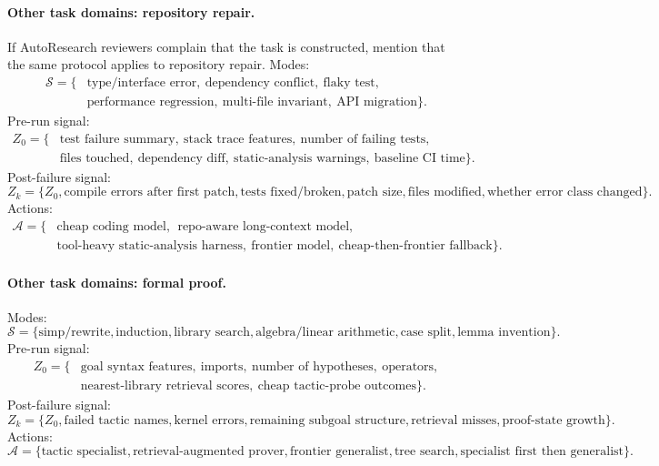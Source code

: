 \documentclass{article}
\begin{document}
\paragraph{Other task domains: repository repair.}
If AutoResearch reviewers complain that the task is constructed, mention that the same protocol
applies to repository repair.
Modes:
\[
\begin{aligned}
    \mathcal S=\{&\text{type/interface error},\ \text{dependency conflict},
    \ \text{flaky test},\\
    &\text{performance regression},\ \text{multi-file invariant},
    \ \text{API migration}\}.
\end{aligned}
\]
Pre-run signal:
\[
\begin{aligned}
    Z_0=\{&\text{test failure summary},\ \text{stack trace features},
    \ \text{number of failing tests},\\
    &\text{files touched},\ \text{dependency diff},
    \ \text{static-analysis warnings},\ \text{baseline CI time}\}.
\end{aligned}
\]
Post-failure signal:
\[
    Z_k
    =
    \{
    Z_0,
    \text{compile errors after first patch},
    \text{tests fixed/broken},
    \text{patch size},
    \text{files modified},
    \text{whether error class changed}
    \}.
\]
Actions:
\[
\begin{aligned}
    \mathcal A=\{&\text{cheap coding model},\
    \ \text{repo-aware long-context model},\\
    &\text{tool-heavy static-analysis harness},\ \text{frontier model},
    \ \text{cheap-then-frontier fallback}\}.
\end{aligned}
\]

\paragraph{Other task domains: formal proof.}
Modes:
\[
    \mathcal S
    =
    \{
    \text{simp/rewrite},
    \text{induction},
    \text{library search},
    \text{algebra/linear arithmetic},
    \text{case split},
    \text{lemma invention}
    \}.
\]
Pre-run signal:
\[
\begin{aligned}
    Z_0=\{&\text{goal syntax features},\ \text{imports},
    \ \text{number of hypotheses},\ \text{operators},\\
    &\text{nearest-library retrieval scores},
    \ \text{cheap tactic-probe outcomes}\}.
\end{aligned}
\]
Post-failure signal:
\[
    Z_k
    =
    \{
    Z_0,
    \text{failed tactic names},
    \text{kernel errors},
    \text{remaining subgoal structure},
    \text{retrieval misses},
    \text{proof-state growth}
    \}.
\]
Actions:
\[
    \mathcal A
    =
    \{
    \text{tactic specialist},
    \text{retrieval-augmented prover},
    \text{frontier generalist},
    \text{tree search},
    \text{specialist first then generalist}
    \}.
\]
\end{document}
